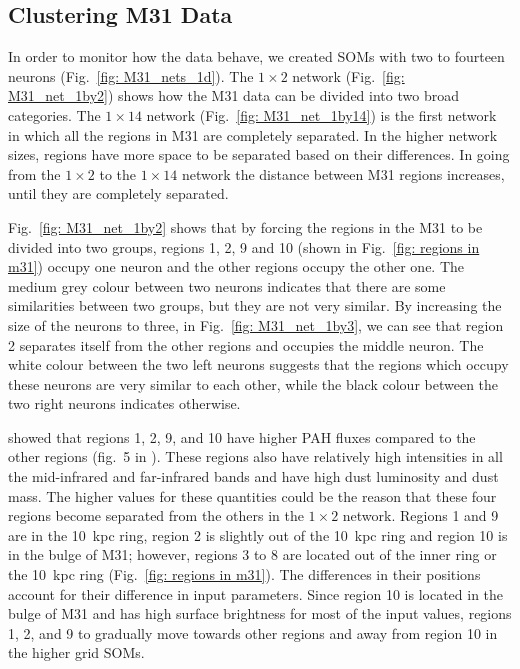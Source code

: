     \subsection{Clustering M31 Data}

        In order to monitor how the data behave, we created SOMs with two to fourteen neurons (Fig.~\ref{fig: M31_nets_1d}).
        The $1\times2$ network (Fig.~\ref{fig: M31_net_1by2}) shows how the M31 data can be divided into two broad categories.
        The $1\times14$ network (Fig.~\ref{fig: M31_net_1by14}) is the first network in which all the regions in M31 are completely separated.
        In the higher network sizes, regions have more space to be separated based on their differences. In going from the $1\times2$ to the $1\times14$ network the distance between M31 regions increases, until they are completely separated. 
        
        Fig.~\ref{fig: M31_net_1by2} shows that by forcing the regions in the M31 to be divided into two groups, regions 1, 2, 9 and 10 (shown in Fig.~\ref{fig: regions in m31}) occupy one neuron and the other regions occupy the other one.
        The medium grey colour between two neurons indicates that there are some similarities between two groups, but they are not very similar. 
        By increasing the size of the neurons to three, in Fig.~\ref{fig: M31_net_1by3}, we can see that region 2 separates itself from the other regions and occupies the middle neuron.
        The white colour between the two left neurons suggests that the regions which occupy these neurons are very similar to each other, while the black colour between the two right neurons indicates otherwise.
        
        \cite{Dim15} showed that regions 1, 2, 9, and 10 have higher PAH fluxes compared to the other regions (fig.~5 in \citealt{Dim15}). 
        These regions also have relatively high intensities in all the mid-infrared and far-infrared bands and have high dust luminosity and dust mass.
        The higher values for these quantities could be the reason that these four regions become separated from the others in the $1\times2$ network.
        Regions 1 and 9 are in the 10~kpc ring, region 2 is slightly out of the 10~kpc ring and region 10 is in the bulge of M31; however, regions 3 to 8 are located out of the inner ring or the 10~kpc ring (Fig.~\ref{fig: regions in m31}).   
        The differences in their positions account for their difference in input parameters.
        Since region 10 is located in the bulge of M31 and has high surface brightness for most of the input values, regions 1, 2, and 9 to gradually move towards other regions and away from region 10 in the higher grid SOMs.
       
